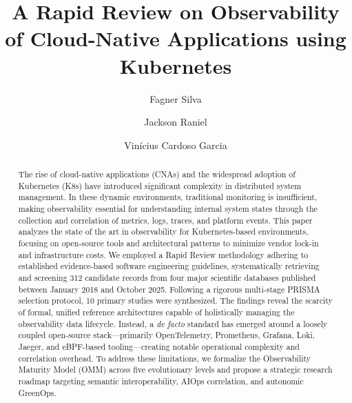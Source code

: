 \documentclass[sigconf, anonymous, balance=false]{acmart}
\begin{document}
\title{A Rapid Review on Observability of Cloud-Native Applications using Kubernetes}

\author{Fagner Silva}

\author{Jackson Raniel}

\author{Vinícius Cardoso Garcia}

\renewcommand{\shortauthors}{Silva et al.}
\renewcommand{\shorttitle}{A Rapid Review on Observability of CNA using K8s}

\begin{abstract}
The rise of cloud-native applications (CNAs) and the widespread adoption of Kubernetes (K8s) have introduced significant complexity in distributed system management. In these dynamic environments, traditional monitoring is insufficient, making observability essential for understanding internal system states through the collection and correlation of metrics, logs, traces, and platform events. This paper analyzes the state of the art in observability for Kubernetes-based environments, focusing on open-source tools and architectural patterns to minimize vendor lock-in and infrastructure costs. We employed a Rapid Review methodology adhering to established evidence-based software engineering guidelines, systematically retrieving and screening 312 candidate records from four major scientific databases published between January 2018 and October 2025. Following a rigorous multi-stage PRISMA selection protocol, 10 primary studies were synthesized. The findings reveal the scarcity of formal, unified reference architectures capable of holistically managing the observability data lifecycle. Instead, a \textit{de facto} standard has emerged around a loosely coupled open-source stack—primarily OpenTelemetry, Prometheus, Grafana, Loki, Jaeger, and eBPF-based tooling—creating notable operational complexity and correlation overhead. To address these limitations, we formalize the Observability Maturity Model (OMM) across five evolutionary levels and propose a strategic research roadmap targeting semantic interoperability, AIOps correlation, and autonomic GreenOps.
\end{abstract}
\end{document}
